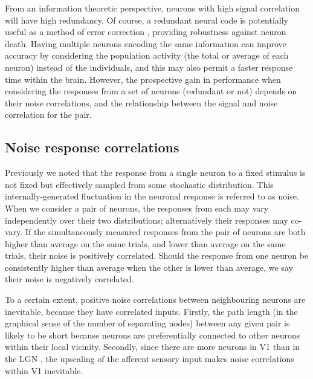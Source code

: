 From an information theoretic perspective, neurons with high signal correlation will have high redundancy.
Of course, a redundant neural code is potentially useful as a method of error correction \citep[Chapter~1]{mackay2003information}, providing robustness against neuron death.
Having multiple neurons encoding the same information can improve accuracy by considering the population activity (the total or average of each neuron) instead of the individuals, and this may also permit a faster response time within the brain.
However, the prospective gain in performance when considering the responses from a set of neurons (redundant or not) depends on their noise correlations, and the relationship between the signal and noise correlation for the pair.


\subsection{Noise response correlations}
\label{sec:bg-noisecorr}

Previously we noted that the response from a single neuron to a fixed stimulus is not fixed but effectively sampled from some stochastic distribution.
This internally-generated fluctuation in the neuronal response is referred to as noise.
When we consider a pair of neurons, the responses from each may vary independently over their two distributions; alternatively their responses may co-vary.
If the simultaneously measured responses from the pair of neurons are both higher than average on the same trials, and lower than average on the same trials, their noise is positively correlated.
Should the response from one neuron be consistently higher than average when the other is lower than average, we say their noise is negatively correlated.

To a certain extent, positive noise correlations between neighbouring neurons are inevitable, because they have correlated inputs.
Firstly, the path length (in the graphical sense of the number of separating nodes) between any given pair is likely to be short because neurons are preferentially connected to other neurons within their local vicinity.
Secondly, since there are more neurons in \ac{V1} than in the \ac{LGN} \citep{Kanitscheider2015}, the upscaling of the afferent sensory input makes noise correlations within \ac{V1} inevitable.


